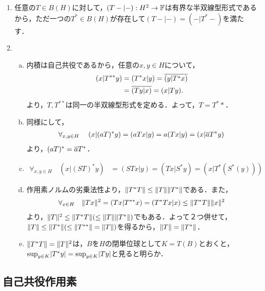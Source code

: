 \documentclass[uplatex,dvipdfmx]{jsreport}
\begin{document}
\begin{Proof}\mbox{}
    \begin{enumerate}
        \item 任意の$T\in B(H)$に対して，$(T-|-):H^2\to\mathbb{F}$は有界な半双線型形式であるから，ただ一つの$T^*\in B(H)$が存在して$(T-|-)=(-|T^*-)$を満たす．
        \item \begin{enumerate}[(a)]
            \item 内積は自己共役であるから，任意の$x,y\in H$について，
            \begin{align*}
                (x|T^{**}y)&=(T^*x|y)=\overline{(y|T^*x)}\\
                &=\overline{(Ty|x)}=(x|Ty).
            \end{align*}
            より，$T,T^{**}$は同一の半双線型形式を定める．よって，$T=T^**$．
            \item 同様にして，
            \begin{align*}
                \forall_{x,y\in H}\;\quad(x|(aT)^*y)=(aTx|y)=a(Tx|y)=(x|\overline{a}T^*y)
            \end{align*}
            より，$(aT)^*=\overline{a}T^*$．
            \item \begin{align*}
                \forall_{x,y\in H}\quad(x|(ST)^*y)&=(STx|y)=(Tx|S^*y)=(x|T^*(S^*(y)))
            \end{align*}
            \item 作用素ノルムの劣乗法性より，$\|T^*T\|\le\|T\|\|T^*\|$である．また，
            \begin{align*}
                \forall_{x\in H}\quad\|Tx\|^2=(Tx|T^{**}x)=(T^*Tx|x)\le\|T^*T\|\|x\|^2
            \end{align*}
            より，$\|T\|^2\le\|T^*T\|(\le\|T\|\|T^*\|)$でもある．よって２つ併せて，$\|T\|\le\|T^*\|(\le\|T^{**}\|=\|T\|)$を得るから，$\|T\|=\|T^*\|$．
            \item $\|T^*T\|=\|T\|^2$は，$B$を$H$の閉単位球として$K=T(B)$とおくと，
            $\sup_{y\in K}\lvert T^*y\rvert=\sup_{y\in K}\lvert Ty\rvert$と見ると明らか．
        \end{enumerate}
    \end{enumerate}
\end{Proof}

\subsection{自己共役作用素}
\end{document}
